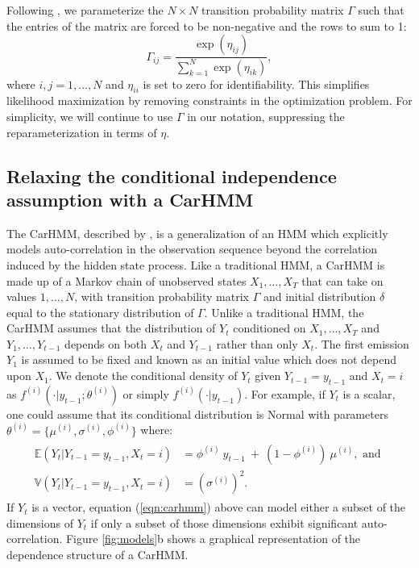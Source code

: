 Following \citet{Barajas:2017}, we parameterize the $N \times N$ transition probability matrix $\Gamma$ such that the entries of the matrix are forced to be non-negative and the rows to sum to 1:
%
\[
\Gamma_{ij} = \frac{\exp(\eta_{ij})}{\sum_{k=1}^N \exp(\eta_{ik})}, 
\]
%
where $i,j = 1,\ldots,N$ and $\eta_{ii}$ is set to zero for identifiability. This simplifies likelihood maximization by removing constraints in the optimization problem. For simplicity, we will continue to use $\Gamma$ in our notation, suppressing the reparameterization in terms of $\eta$.


\subsection{Relaxing the conditional independence assumption with a CarHMM}

The CarHMM, described by \citet{Lawler:2019}, is a generalization of an HMM which explicitly models auto-correlation in the observation sequence beyond the correlation induced by the hidden state process. Like a traditional HMM, a CarHMM is made up of a Markov chain of unobserved states $X_1,\ldots, X_T$ that can take on values $1, \ldots, N$, with transition probability matrix $\Gamma$ and initial distribution $\delta$ equal to the stationary distribution of $\Gamma$. Unlike a traditional HMM, the CarHMM assumes that the distribution of $Y_t$ conditioned on $X_1,\ldots, X_T$ and $Y_1,\ldots, Y_{t-1}$ depends on both $X_t$ and $Y_{t-1}$ rather than only $X_t$. 
The first emission $Y_1$ is assumed to be fixed and known as an initial value which does not depend upon $X_1$.
%
We denote the conditional density of $Y_t$ given $Y_{t-1} = y_{t-1}$ and $X_t=i$ as $f^{(i)}( \cdot | y_{t-1}; \theta^{(i)})$ or simply $f^{(i)}( \cdot | y_{t-1})$.
For example, if $Y_t$ is a scalar, one could assume that its conditional distribution is Normal with parameters $\theta^{(i)} = \{\mu^{(i)},\sigma^{(i)},\phi^{(i)}\}$ where:
%
\begin{align}
\label{eqn:carhmm}
\begin{split}
\mathbb{E}(Y_t|Y_{t-1} = y_{t-1},X_t=i) &= \phi^{(i)} ~ y_{t-1} ~+ ~(1-\phi^{(i)})  ~\mu^{(i)}, \text{ and } \\
\mathbb{V}(Y_t| Y_{t-1} = y_{t-1}, X_t = i) &= (\sigma^{(i)})^2.
\end{split}
\end{align}
%
If $Y_t$ is a vector, equation (\ref{eqn:carhmm}) above can model either a subset of the dimensions of $Y_t$ if only a subset of those dimensions exhibit significant auto-correlation. Figure \ref{fig:models}b shows a graphical representation of the dependence structure of a CarHMM.

